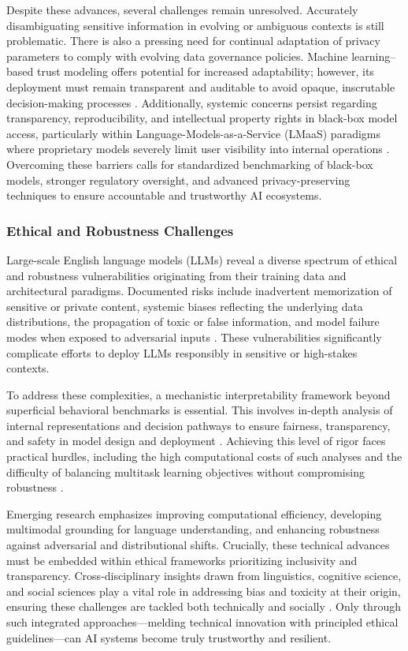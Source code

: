 \documentclass[sigconf]{acmart}
\begin{document}
Despite these advances, several challenges remain unresolved. Accurately disambiguating sensitive information in evolving or ambiguous contexts is still problematic. There is also a pressing need for continual adaptation of privacy parameters to comply with evolving data governance policies. Machine learning–based trust modeling offers potential for increased adaptability; however, its deployment must remain transparent and auditable to avoid opaque, inscrutable decision-making processes \cite{ref11}. Additionally, systemic concerns persist regarding transparency, reproducibility, and intellectual property rights in black-box model access, particularly within Language-Models-as-a-Service (LMaaS) paradigms where proprietary models severely limit user visibility into internal operations \cite{ref8}. Overcoming these barriers calls for standardized benchmarking of black-box models, stronger regulatory oversight, and advanced privacy-preserving techniques to ensure accountable and trustworthy AI ecosystems.

\subsubsection{Ethical and Robustness Challenges}

Large-scale English language models (LLMs) reveal a diverse spectrum of ethical and robustness vulnerabilities originating from their training data and architectural paradigms. Documented risks include inadvertent memorization of sensitive or private content, systemic biases reflecting the underlying data distributions, the propagation of toxic or false information, and model failure modes when exposed to adversarial inputs \cite{ref34}. These vulnerabilities significantly complicate efforts to deploy LLMs responsibly in sensitive or high-stakes contexts.

To address these complexities, a mechanistic interpretability framework beyond superficial behavioral benchmarks is essential. This involves in-depth analysis of internal representations and decision pathways to ensure fairness, transparency, and safety in model design and deployment \cite{ref11,ref12,ref13,ref34,ref35}. Achieving this level of rigor faces practical hurdles, including the high computational costs of such analyses and the difficulty of balancing multitask learning objectives without compromising robustness \cite{ref16}.

Emerging research emphasizes improving computational efficiency, developing multimodal grounding for language understanding, and enhancing robustness against adversarial and distributional shifts. Crucially, these technical advances must be embedded within ethical frameworks prioritizing inclusivity and transparency. Cross-disciplinary insights drawn from linguistics, cognitive science, and social sciences play a vital role in addressing bias and toxicity at their origin, ensuring these challenges are tackled both technically and socially \cite{ref34,ref35}. Only through such integrated approaches—melding technical innovation with principled ethical guidelines—can AI systems become truly trustworthy and resilient.
\end{document}
